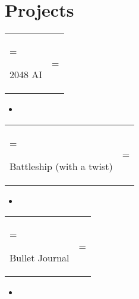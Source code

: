 \documentclass[letterpaper,11pt]{article}
\begin{document}
\section*{Projects}
\begin{tabularx}{\textwidth}{ 
  >{\hsize=0.7\textwidth\linewidth=\textwidth\raggedright\arraybackslash}X 
  >{\hsize=0.3\textwidth\linewidth=\textwidth\raggedleft\arraybackslash}X}
  \hspace*{0.03mm} 
  {2048 AI} \\
\end{tabularx}
\begin{itemize}
    \item 
\end{itemize}
\begin{tabularx}{\textwidth}{ 
  >{\hsize=0.7\textwidth\linewidth=\textwidth\raggedright\arraybackslash}X 
  >{\hsize=0.3\textwidth\linewidth=\textwidth\raggedleft\arraybackslash}X}
  \hspace*{0.03mm} 
  {Battleship (with a twist)}\\
\end{tabularx}
\begin{itemize}
    \item 
\end{itemize}
\begin{tabularx}{\textwidth}{ 
  >{\hsize=0.7\textwidth\linewidth=\textwidth\raggedright\arraybackslash}X 
  >{\hsize=0.3\textwidth\linewidth=\textwidth\raggedleft\arraybackslash}X}
  \hspace*{0.03mm} 
  {Bullet Journal}\\
\end{tabularx}
\begin{itemize}
    \item 
\end{itemize}

\end{document}
